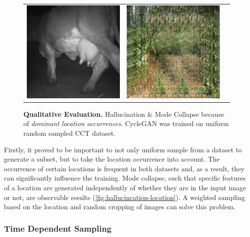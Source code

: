 \documentclass[a4paper,11pt, DIV=12]{scrartcl}
\begin{document}
\begin{figure}[ht]
\begin{tabularx}{.4\textwidth}{>{\centering\arraybackslash}X >{\centering\arraybackslash}X >{\centering\arraybackslash}X}
      \includegraphics{img/586936d3-23d2-11e8-a6a3-ec086b02610b_real.png} & \includegraphics{img/586936d3-23d2-11e8-a6a3-ec086b02610b_hal.png}
   \end{tabularx}
   \caption{
      \textbf{Qualitative Evaluation.} Hallucination \& Mode Collapse because of \textit{dominant location occurrences}.
      CycleGAN was trained on uniform random sampled CCT dataset.
   }
   \label{fig:hallucincation-location}
\end{figure}

Firstly, it proved to be important to not only uniform sample from a dataset to generate a subset, but to take the location occurrence into account.
The occurrence of certain locations is frequent in both datasets and, as a result, they can significantly influence the training.
Mode collapse, such that specific features of a location are generated independently of whether they are in the input image or not, are
observable results (\autoref{fig:hallucincation-location}). A weighted sampling based on the location and random cropping of images can solve this problem.

\subsubsection*{Time Dependent Sampling}
\label{sec:time-dependent-sampling}
\end{document}
